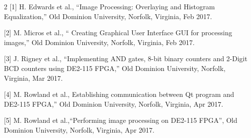\documentclass{article}
\begin{document}
\begin{multicols*}{2}
[1]	H. Edwards et al., “Image Processing: Overlaying and Histogram Equalization,” Old Dominion University, Norfolk, Virginia, Feb 2017.

[2]     M. Micros et al., “ Creating Graphical User Interface GUI for processing images,” Old Dominion University, Norfolk, Virginia, Feb 2017.

[3]	J. Rigney et al., “Implementing AND gates, 8-bit binary counters and 2-Digit BCD counters using DE2-115 FPGA,” Old Dominion University, Norfolk, Virginia,  Mar 2017.

[4]	M. Rowland et al.,  Establishing communication between Qt program and DE2-115 FPGA,” Old Dominion University, Norfolk, Virginia, Apr 2017.

[5]  	M. Rowland et al.,“Performing image processing on DE2-115 FPGA”, Old Dominion University, Norfolk, Virginia, Apr 2017.
\end{multicols*}




\end{document}
